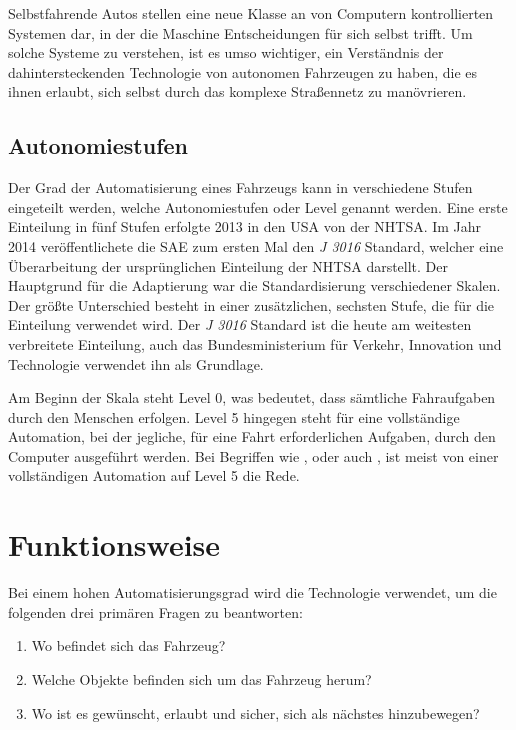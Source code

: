 Selbstfahrende Autos stellen eine neue Klasse an von Computern kontrollierten Systemen dar, in der die Maschine Entscheidungen für sich selbst trifft. Um solche Systeme zu verstehen, ist es umso wichtiger, ein Verständnis der dahintersteckenden Technologie von autonomen Fahrzeugen zu haben, die es ihnen erlaubt, sich selbst durch das komplexe Straßennetz zu manövrieren.

\subsection{Autonomiestufen}
Der Grad der Automatisierung eines Fahrzeugs kann in verschiedene Stufen eingeteilt werden, welche Autonomiestufen oder Level genannt werden. Eine erste Einteilung in fünf Stufen erfolgte 2013 in den USA von der \ac{NHTSA}. Im Jahr 2014 veröffentlichete die \ac{SAE} zum ersten Mal den \textit{J 3016} Standard, welcher eine Überarbeitung der ursprünglichen Einteilung der \ac{NHTSA} darstellt. Der Hauptgrund für die Adaptierung war die Standardisierung verschiedener Skalen. Der größte Unterschied besteht in einer zusätzlichen, sechsten Stufe, die für die Einteilung verwendet wird. Der \textit{J 3016} Standard ist die heute am weitesten verbreitete Einteilung, auch das Bundesministerium für Verkehr, Innovation und Technologie verwendet ihn als Grundlage. 

Am Beginn der Skala steht Level 0, was bedeutet, dass sämtliche Fahraufgaben durch den Menschen erfolgen. Level 5 hingegen steht für eine vollständige Automation, bei der jegliche, für eine Fahrt erforderlichen Aufgaben, durch den Computer ausgeführt werden. Bei Begriffen wie ,  oder auch , ist meist von einer vollständigen Automation auf Level 5 die Rede.

\nocite{wiki-levels}



\section{Funktionsweise}

Bei einem hohen Automatisierungsgrad wird die Technologie verwendet, um die folgenden drei primären Fragen zu beantworten:
\begin{enumerate}
  \item{Wo befindet sich das Fahrzeug?}
  \item{Welche Objekte befinden sich um das Fahrzeug herum?}
  \item{Wo ist es gewünscht, erlaubt und sicher, sich als nächstes hinzubewegen?}
\end{enumerate}

